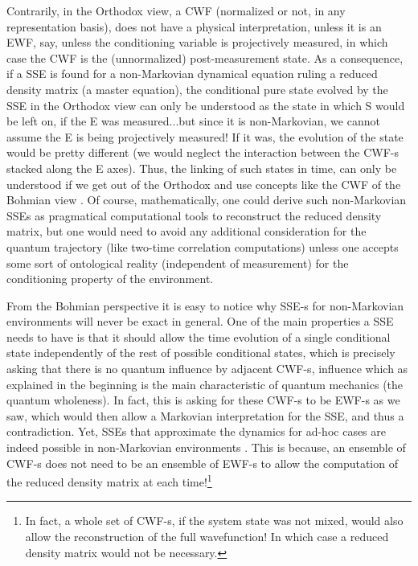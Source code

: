 \documentclass[11pt, a4paper]{article} %
\begin{document}
Contrarily, in the Orthodox view, a CWF (normalized or not, in any representation basis), does not have a physical interpretation, unless it is an EWF, say, unless the conditioning variable is projectively measured, in which case the CWF is the (unnormalized) post-measurement state. As a consequence, if a SSE is found for a non-Markovian dynamical equation ruling a reduced density matrix (a master equation), the conditional pure state evolved by the SSE in the Orthodox view can only be understood as the state in which S would be left on, if the E was measured...but since it is non-Markovian, we cannot assume the E is being projectively measured! If it was, the evolution of the state would be pretty different (we would neglect the interaction between the CWF-s stacked along the E axes). Thus, the linking of such states in time, can only be understood if we get out of the Orthodox and use concepts like the CWF of the Bohmian view \cite{NMisModal, interpretSSE}. Of course, mathematically, one could derive such non-Markovian SSEs as pragmatical computational tools to reconstruct the reduced density matrix, but one would need to avoid any additional consideration for the quantum trajectory (like two-time correlation computations) unless one accepts some sort of ontological reality (independent of measurement) for the conditioning property of the environment.

From the Bohmian perspective it is easy to notice why SSE-s for non-Markovian environments will never be exact in general. One of the main properties a SSE needs to have is that it should allow the time evolution of a single conditional state independently of the rest of possible conditional states, which is precisely asking that there is no quantum influence by adjacent CWF-s, influence which as explained in the beginning is the main characteristic of quantum mechanics (the quantum wholeness). In fact, this is asking for these CWF-s to be EWF-s as we saw, which would then allow a Markovian interpretation for the SSE, and thus a contradiction. Yet, SSEs that approximate the dynamics for ad-hoc cases are indeed possible in non-Markovian environments \cite{ Diosi, WisemanSSE, Thz}. This is because, an ensemble of CWF-s does not need to be an ensemble of EWF-s to allow the computation of the reduced density matrix at each time!\footnote{In fact, a whole set of CWF-s, if the system state was not mixed, would also allow the reconstruction of the full wavefunction! In which case a reduced density matrix would not be necessary.} 
\end{document}
